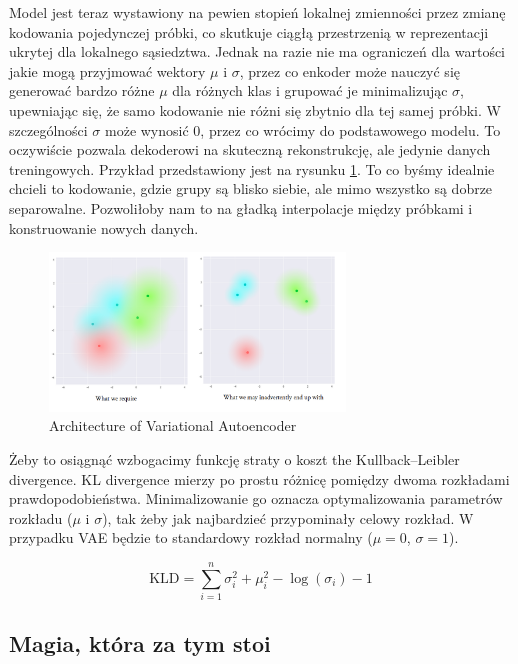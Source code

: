 Model jest teraz wystawiony na pewien stopień lokalnej zmienności przez zmianę kodowania pojedynczej próbki, co skutkuje ciągłą przestrzenią w reprezentacji ukrytej dla lokalnego sąsiedztwa. Jednak na razie nie ma ograniczeń dla wartości jakie mogą przyjmować wektory $\mu$ i $\sigma$, przez co enkoder może nauczyć się generować bardzo różne $\mu$ dla różnych klas i grupować je minimalizując $\sigma$, upewniając się, że samo kodowanie nie różni się zbytnio dla tej samej próbki. W szczególności $\sigma$ może wynosić 0, przez co wrócimy do podstawowego modelu. To oczywiście pozwala dekoderowi na skuteczną rekonstrukcję, ale jedynie danych treningowych. Przykład przedstawiony jest na rysunku \ref{fig:vae_nolimits}. To co byśmy idealnie chcieli to kodowanie, gdzie grupy są blisko siebie, ale mimo wszystko są dobrze separowalne. Pozwoliłoby nam to na gładką interpolacje między próbkami i konstruowanie nowych danych.

\begin{figure}[h!]
    \centering
    \includegraphics[width=0.7\textwidth]{images/vae_nolimits}
    \caption{Architecture of Variational Autoencoder}
    \label{fig:vae_nolimits}
\end{figure}

Żeby to osiągnąć wzbogacimy funkcję straty o koszt the Kullback–Leibler divergence. KL divergence mierzy po prostu różnicę pomiędzy dwoma rozkładami prawdopodobieństwa. Minimalizowanie go oznacza optymalizowania parametrów rozkładu ($\mu$ i $\sigma$), tak żeby jak najbardzieć przypominały celowy rozkład. W przypadku VAE będzie to standardowy rozkład normalny ($\mu = 0$,  $\sigma = 1$).

$$
\mathrm { KLD } = \sum _ { i = 1 } ^ { n } \sigma _ { i } ^ { 2 } + \mu _ { i } ^ { 2 } - \log \left( \sigma _ { i } \right) - 1
$$

\subsection{Magia, która za tym stoi}

